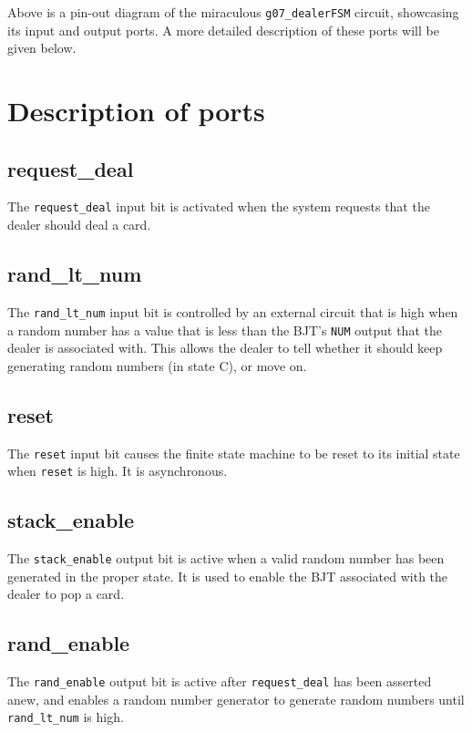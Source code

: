 \documentclass[12pt]{report}
\begin{document}
Above is a pin-out diagram of the miraculous \texttt{g07\_dealerFSM} circuit, showcasing its input
and output ports. A more detailed description of these ports will be given below.

\section*{Description of ports}
\subsection*{request\_deal}
The \texttt{request\_deal} input bit is activated when the system requests that the dealer should
deal a card.
\subsection*{rand\_lt\_num}
The \texttt{rand\_lt\_num} input bit is controlled by an external circuit that is high when a random
number has a value that is less than the BJT's \texttt{NUM} output that the dealer is associated
with. This allows the dealer to tell whether it should keep generating random numbers (in state C),
or move on.
\subsection*{reset}
The \texttt{reset} input bit causes the finite state machine to be reset to its initial state when
\texttt{reset} is high. It is asynchronous.
\subsection*{stack\_enable}
The \texttt{stack\_enable} output bit is active when a valid random number has been generated in the
proper state. It is used to enable the BJT associated with the dealer to pop a card.
\subsection*{rand\_enable}
The \texttt{rand\_enable} output bit is active after \texttt{request\_deal} has been asserted anew,
and enables a random number generator to generate random numbers until \texttt{rand\_lt\_num} is
high.
\end{document}
